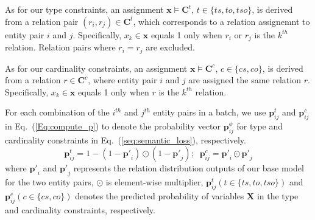 
As for our type constraints, an assignment $\bm x \models \bm{C}^t$, $t\in\{ts,to,tso\}$, is derived from a relation pair $(r_i, r_j) \in \bm{C}^{t}$, which corresponds to a relation assignemnt to entity pair $i$ and $j$.
Specifically, $x_k\in \bm{x}$ equals 1 only when $r_i$ or $r_j$ is the $k^{th}$ relation.
Relation pairs where $r_i=r_j$ are excluded.

As for our cardinality constraints, an assignment $\bm x \models \bm{C}^c$, $c\in\{cs,co\}$, is derived from a relation $r \in \bm{C}^{c}$, where entity pair $i$ and $j$ are assigned the same relation $r$.
Specifically, $x_k\in \bm{x}$ equals 1 only when $r$ is the $k^{th}$ relation.

For each combination of the $i^{th}$ and $j^{th}$ entity pairs in a batch, we use $\bm{p}_{ij}^{t}$ and $\bm{p}_{ij}^{c}$ in Eq.~(\ref{Eq:compute_p}) to denote the probability vector $\bm{p}^{\phi}_{ij}$ for type and cardinality constraints in Eq.~(\ref{seq:semantic_loss}), respectively.
\begin{equation}
\label{Eq:compute_p}
\bm{p}_{ij}^{t} = 1-(1-\bm{p'}_{i}) \odot (1-\bm{p'}_{j});\;\; \bm{p}_{ij}^{c} = \bm{p'}_{i} \odot \bm{p'}_{j}
\end{equation}
where $\bm{p'}_i$ and $\bm{p'}_j$ represents the relation distribution outputs of our base model for the two entity pairs,
$\odot$ is element-wise multiplier,
$\bm{p}_{ij}^{t}(t \in \{ts, to, tso\})$ and $\bm{p}_{ij}^{c}(c \in \{cs, co\})$ denotes the predicted probability of variables $\bm{X}$ in the type and cardinality constraints, respectively.

